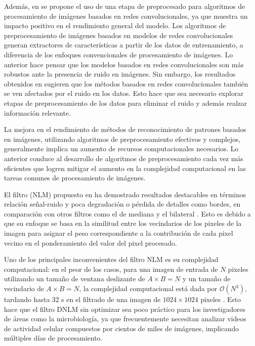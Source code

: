 Adem\'as, en \cite{CNN_DNLM} se propone el uso de una etapa de preprocesado para algoritmos de procesamiento de im\'agenes basados en redes convolucionales, ya que muestra un impacto positivo en el rendimiento general del modelo. Los algoritmos de preprocesamiento de im\'agenes basados en modelos de redes convolucionales generan extractores de caracter\'isticas a partir de los datos de entrenamiento, a diferencia de los enfoques convencionales de procesamiento de im\'agenes. Lo anterior hace pensar que los modelos basados en redes convolucionales son m\'as robustos ante la presencia de ruido en im\'agenes. Sin embargo, los resultados obtenidos en \cite{CNN_DNLM} sugieren que los m\'etodos basados en redes convolucionales tambi\'en se ven afectados por el ruido en los datos. Esto hace que sea necesario explorar etapas de preprocesamiento de los datos para eliminar el ruido y adem\'as realzar informaci\'on relevante.

La mejora en el rendimiento de m\'etodos de reconocimiento de patrones basados en im\'agenes, utilizando algoritmos de preprocesamiento efectivos y complejos, generalmente implica un aumento de recursos computacionales necesarios. Lo anterior conduce al desarrollo de algoritmos de preprocesamiento cada vez m\'as eficientes que logren mitigar el aumento en la complejidad computacional en las tareas comunes de procesamiento de im\'agenes. 


El filtro  (NLM) propuesto en \cite{buades2005non} ha demostrado resultados destacables en t\'erminos relaci\'on se\~nal-ruido y poca degradaci\'on o p\'erdida de detalles como bordes, en comparaci\'on con otros filtros como el de mediana y el bilateral \cite{CONCAPAN2016}. Esto es debido a que su enfoque se basa en la similitud entre los vecindarios de los pixeles de la imagen para asignar el peso correspondiente a la contribuci\'on de cada pixel vecino en el ponderamiento del valor del pixel procesado. 

Uno de los principales inconvenientes del filtro NLM es su complejidad computacional: en el peor de los casos, para una imagen de entrada de $N$ pixeles utilizando un tamaño de ventana deslizante de $A\times B = N$ y un tamaño de vecindario de $A\times B = N$, la complejidad computacional est\'a dada por $\mathcal{O}(N^{3})$, tardando hasta $32$ s en el filtrado de una imagen de $1024 \times 1024$ pixeles \cite{Zhu2016}. Esto hace que el filtro DNLM sin optimizar sea poco pr\'actico para los investigadores de \'areas como la microbiolog\'ia, ya que frecuentemente necesitan analizar videos de actividad celular compuestos por cientos de miles de im\'agenes, implicando m\'ultiples d\'ias de procesamiento. 

